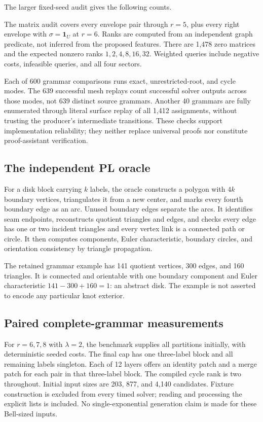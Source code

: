 \documentclass[11pt,a4paper]{article}
\theoremstyle{definition}
\theoremstyle{remark}
\newcommand{\one}{\mathbf 1}
\begin{document}
The larger fixed-seed audit gives the following counts.

\begin{table}[htbp]
\centering\small
\caption{Executed counts from \texttt{results/audit.json}; every check passed.}
\label{tab:audit}
\end{table}

The matrix audit covers every envelope pair through $r=5$, plus every right envelope with
$\sigma=\one_U$ at $r=6$. Ranks are computed from an independent graph predicate,
not inferred from the proposed features. There are 1,478 zero matrices and the expected
nonzero ranks $1,2,4,8,16,32$. Weighted queries include negative costs, infeasible queries,
and all four sectors.

Each of 600 grammar comparisons runs exact, unrestricted-root, and cycle modes. The 639
successful mesh replays count successful solver outputs across those modes, not 639 distinct
source grammars. Another 40 grammars are fully enumerated through literal surface replay
of all 1,412 assignments, without trusting the producer's intermediate transitions.
These checks support implementation reliability; they neither replace universal proofs nor
constitute proof-assistant verification.

\subsection{The independent PL oracle}
For a disk block carrying $k$ labels, the oracle constructs a polygon with $4k$ boundary
vertices, triangulates it from a new center, and marks every fourth boundary edge as an
arc. Unused boundary edges separate the arcs. It identifies seam endpoints, reconstructs
quotient triangles and edges, and checks every edge has one or two incident triangles
and every vertex link is a connected path or circle. It then computes components, Euler
characteristic, boundary circles, and orientation consistency by triangle propagation.

The retained grammar example has 141 quotient vertices, 300 edges, and 160 triangles.
It is connected and orientable with one boundary component and Euler characteristic
$141-300+160=1$: an abstract disk. The example is not asserted to encode any particular
knot exterior.

\subsection{Paired complete-grammar measurements}
For $r=6,7,8$ with $\lambda=2$, the benchmark supplies all partitions initially, with
deterministic seeded costs. The final cap has one three-label block and all remaining
labels singleton. Each of 12 layers offers an identity patch and a merge patch for each
pair in that three-label block. The compiled cycle rank is two throughout.
Initial input sizes are 203, 877, and 4,140 candidates. Fixture construction is excluded
from every timed solver; reading and processing the explicit lists is included. No
single-exponential generation claim is made for these Bell-sized inputs.
\end{document}
